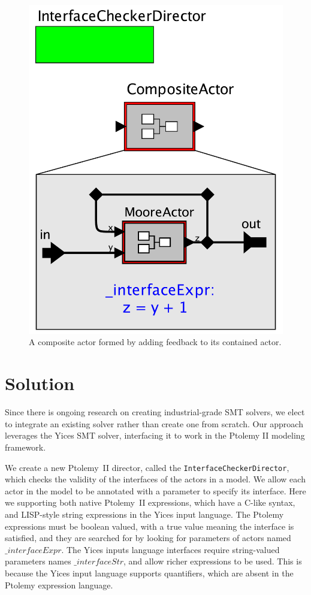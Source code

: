 \documentclass[preprint,11pt]{sigplanconf}
\begin{document}
\begin{figure}[htbp]
\centering %
\includegraphics[width=\columnwidth]{figs/feedbackComp}
\caption{A composite actor formed by adding feedback to its contained actor.}
\label{fig:feedbackComp}
\end{figure}

\section{Solution}
Since there is ongoing research on creating industrial-grade SMT solvers,
we elect to integrate an existing solver rather than create one from scratch.
Our approach leverages the Yices\cite{yices} SMT solver, interfacing it to
work in the Ptolemy II\cite{ptII} modeling framework.

We create a new Ptolemy~II director, called the
\texttt{InterfaceCheckerDirector}, which checks the validity of the interfaces of
the actors in a model. We allow each actor in the model to be annotated with a
parameter to specify its interface. Here we supporting both native Ptolemy~II
expressions, which have a C-like syntax, and LISP-style string expressions in the
Yices input language. The Ptolemy expressions must be boolean valued, with a true
value meaning the interface is satisfied, and they are searched for by looking
for parameters of actors named $\_interfaceExpr$. The Yices inputs language
interfaces require string-valued parameters names $\_interfaceStr$, and allow
richer expressions to be used. This is because the Yices input language supports
quantifiers, which are absent in the Ptolemy expression language.
\end{document}
